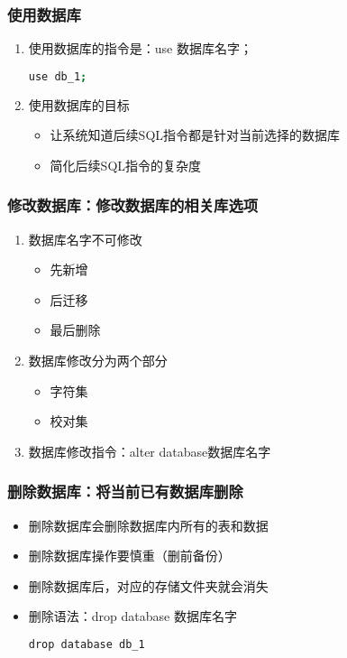 \subsubsection{使用数据库}
\begin{enumerate}
\item 使用数据库的指令是：use 数据库名字；
\begin{lstlisting}[language=bash]
use db_1;
\end{lstlisting}
\item 使用数据库的目标
\begin{itemize}
\item 让系统知道后续SQL指令都是针对当前选择的数据库
\item  简化后续SQL指令的复杂度
\end{itemize}

\end{enumerate}

\subsubsection{修改数据库：修改数据库的相关库选项}
\begin{enumerate}
\item 数据库名字不可修改
\begin{itemize}
\item 先新增
\item 后迁移
\item 最后删除
\end{itemize}
\item 数据库修改分为两个部分
\begin{itemize}
\item 字符集
\item 校对集
\end{itemize}
\item 数据库修改指令：alter database数据库名字
\end{enumerate}
\subsubsection{删除数据库：将当前已有数据库删除}
\begin{itemize}
\item 删除数据库会删除数据库内所有的表和数据
\item 删除数据库操作要慎重（删前备份）
\item 删除数据库后，对应的存储文件夹就会消失
\item 删除语法：drop database 数据库名字
\begin{lstlisting}[language=bash]
drop database db_1
\end{lstlisting}
\end{itemize}

